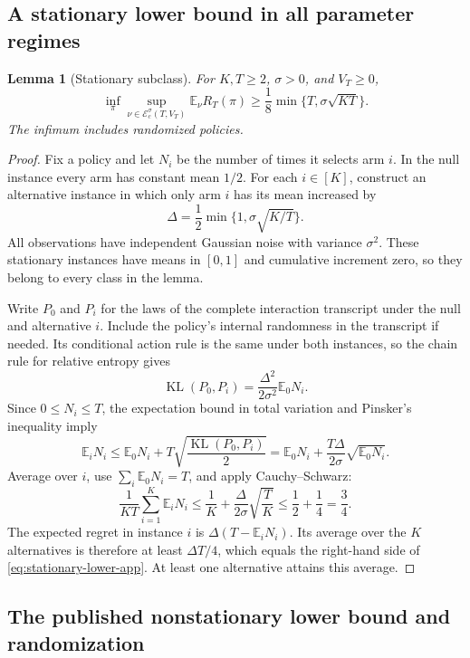 \documentclass[11pt]{article}
\newtheorem{lemma}[lemma]{Lemma}
\theoremstyle{remark}
\newcommand{\E}{\mathbb E}
\newcommand{\cE}{\mathcal E}
\begin{document}
\subsection{A stationary lower bound in all parameter regimes}

\begin{samepage}
\begin{lemma}[Stationary subclass]\label{lem:stationary-lower-app}
For $K,T\ge2$, $\sigma>0$, and $V_T\ge0$,
\begin{equation}\label{eq:stationary-lower-app}
\inf_\pi\sup_{\nu\in\cE_c^\sigma(T,V_T)}
\E_\nu R_T(\pi)
\ge\frac18\min\{T,\sigma\sqrt{KT}\}.
\end{equation}
The infimum includes randomized policies.
\end{lemma}
\end{samepage}

\begin{proof}
Fix a policy and let $N_i$ be the number of times it selects arm $i$.
In the null instance every arm has constant mean $1/2$.
For each $i\in[K]$, construct an alternative instance in which only
arm $i$ has its mean increased by
\[
\Delta=\frac12\min\{1,\sigma\sqrt{K/T}\}.
\]
All observations have independent Gaussian noise with variance
$\sigma^2$.  These stationary instances have means in $[0,1]$ and
cumulative increment zero, so they belong to every class in the lemma.

Write $P_0$ and $P_i$ for the laws of the complete interaction transcript
under the null and alternative $i$.  Include the policy's internal
randomness in the transcript if needed.  Its conditional action rule is
the same under both instances, so the chain rule for relative entropy
gives
\[
\operatorname{KL}(P_0,P_i)
=\frac{\Delta^2}{2\sigma^2}\E_0N_i.
\]
Since $0\le N_i\le T$, the expectation bound in total variation and
Pinsker's inequality imply
\[
\E_iN_i
\le \E_0N_i+T\sqrt{\frac{\operatorname{KL}(P_0,P_i)}2}
=\E_0N_i+\frac{T\Delta}{2\sigma}\sqrt{\E_0N_i}.
\]
Average over $i$, use $\sum_i\E_0N_i=T$, and apply Cauchy--Schwarz:
\[
\frac1{KT}\sum_{i=1}^K\E_iN_i
\le\frac1K+\frac{\Delta}{2\sigma}\sqrt{\frac TK}
\le\frac12+\frac14=\frac34.
\]
The expected regret in instance $i$ is
$\Delta(T-\E_iN_i)$.  Its average over the $K$ alternatives is therefore
at least $\Delta T/4$, which equals the right-hand side of
\eqref{eq:stationary-lower-app}.  At least one alternative attains this
average.
\end{proof}

\subsection{The published nonstationary lower bound and randomization}
\label{app:lower}
\end{document}
